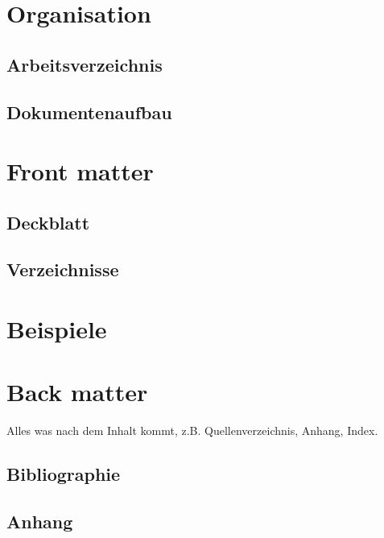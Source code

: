 \section{Organisation}
\label{ch:organisation}

	\subsection{Arbeitsverzeichnis}
	
	
	\subsection{Dokumentenaufbau}
	

	
\clearpage
\section{Front matter}
	\subsection{Deckblatt}
	
	
	\subsection{Verzeichnisse}
	

\clearpage
\section{Beispiele}



\clearpage
\section{Back matter}
	Alles was nach dem Inhalt kommt, z.B.
	Quellenverzeichnis, Anhang, Index.
	
	\subsection{Bibliographie}
	
	
	\subsection{Anhang}
	